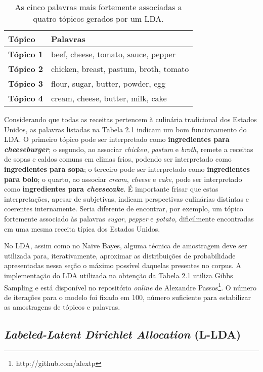 \begin{table}[h]
\centering
\label{table-lda}
\begin{tabular}{| l | p{7cm} | }
\hline
\textbf{Tópico} & \textbf{Palavras} \\ \hline
\textbf{Tópico 1} & beef, cheese, tomato, sauce, pepper \\ \hline
\textbf{Tópico 2} & chicken, breast, pastum, broth, tomato \\ \hline
\textbf{Tópico 3} & flour, sugar, butter, powder, egg  \\ \hline
\textbf{Tópico 4} & cream, cheese, butter, milk, cake \\ \hline
\end{tabular}
\caption{As cinco palavras mais fortemente associadas a quatro tópicos gerados por um LDA.}
\end{table}

Considerando que todas as receitas pertencem à culinária tradicional dos Estados Unidos, as palavras listadas na Tabela 2.1 indicam um bom funcionamento do LDA. O primeiro tópico pode ser interpretado como \textbf{ingredientes para          \emph{cheeseburger}}; o segundo, ao associar \emph{chicken}, \emph{pastum} e \emph{broth}, remete a receitas de sopas e caldos comuns em climas frios, podendo ser interpretado como \textbf{ingredientes para sopa}; o terceiro pode ser interpretado como \textbf{ingredientes para bolo}; o quarto, ao associar \emph{cream}, \emph{cheese} e \emph{cake}, pode ser interpretado como \textbf{ingredientes para \emph{cheesecake}}. É importante frisar que estas interpretações, apesar de subjetivas, indicam perspectivas culinárias distintas e coerentes internamente. Seria diferente de encontrar, por exemplo, um tópico fortemente associado às palavras \emph{sugar}, \emph{pepper} e \emph{potato}, dificilmente encontradas em uma mesma receita típica dos Estados Unidos.


No LDA, assim como no Naïve Bayes, alguma técnica de amostragem deve ser utilizada para, iterativamente, aproximar as distribuições de probabilidade apresentadas nessa seção o máximo possível daquelas presentes no corpus. A implementação do LDA utilizada na obtenção da Tabela 2.1 utiliza Gibbs Sampling e está disponível no repositório \emph{online} de Alexandre Passos\footnote{http://github.com/alextp}. O número de iterações para o modelo foi fixado em 100, número suficiente para estabilizar as amostragens de tópicos e palavras.

\subsection{\emph{Labeled-Latent Dirichlet Allocation} (L-LDA)}

